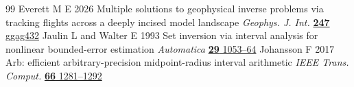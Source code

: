 \documentclass[anonymous,12pt]{iopjournal}
\theoremstyle{remark}\newtheorem{remark}[theorem]{Remark}
\numberwithin{equation}{section}
\begin{document}
\begin{thebibliography}{99}
Everett M E 2026 Multiple solutions to geophysical inverse problems via tracking flights across a deeply incised model landscape \emph{Geophys. J. Int.} \href{https://doi.org/10.1093/gji/ggag432}{\textbf{247} ggag432}
Jaulin L and Walter E 1993 Set inversion via interval analysis for nonlinear bounded-error estimation \emph{Automatica} \href{https://doi.org/10.1016/0005-1098(93)90106-4}{\textbf{29} 1053--64}
 Johansson F 2017 Arb: efficient arbitrary-precision midpoint-radius interval arithmetic \emph{IEEE Trans. Comput.} \href{https://doi.org/10.1109/TC.2017.2690633}{\textbf{66} 1281--1292}
\end{thebibliography}
\endgroup
\end{document}

